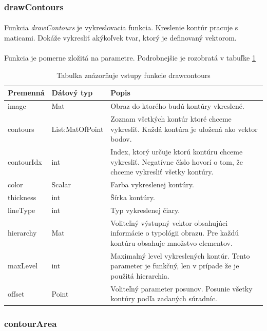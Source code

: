 \documentclass[12pt]{article}
\begin{document}
\subsubsection{drawContours}
\paragraph{}
Funkcia \emph{drawContours} je vykreslovacia funkcia. Kreslenie kontúr pracuje s maticami. Dokáže vykresliť akýkoľvek tvar, ktorý je definovaný vektorom.
\cite{OpenCVDoc}
\paragraph{}
Funkcia je pomerne zložitá na parametre. Podrobnejšie je rozobratá v tabuľke \ref{drawcontoursPar}
\begin{table}
	\centering
    \begin{tabular}{ | l | l | p{5cm} |}
    \hline
    Premenná & Dátový typ & Popis \\ \hline
    image & Mat & Obraz do ktorého budú kontúry vkreslené. \\ \hline
    contours & List:MatOfPoint & Zoznam všetkých kontúr ktoré chceme vykresliť. Každá kontúra je uložená ako vektor bodov. \\ \hline
    contourIdx & int & Index, ktorý určuje ktorú kontúru chceme vykresliť. Negatívne číslo hovorí o tom, že chceme vykresliť všetky kontúry. \\ \hline
    color & Scalar & Farba vykreslenej kontúry. \\ \hline
    thickness & int & Šírka kontúry. \\ \hline
    lineType & int & Typ vykreslenej čiary. \\ \hline
    hierarchy & Mat & Voliteľný výstupný vektor obsahujúci informácie o typológii obrazu. Pre každú kontúru obsahuje množstvo elementov. \\ \hline
    maxLevel & int & Maximalný level vykreslených kontúr. Tento parameter je funkčný, len v prípade že je použitá hierarchia. \\ \hline
    offset & Point & Voliteľný parameter posunov. Posunie všetky kontúry podľa zadaných súradníc. \\
    \hline
    \end{tabular}
  	\caption{Tabulka znázorňuje vstupy funkcie drawcontours}
  	\label{drawcontoursPar}
\end{table}
\subsubsection{contourArea}
\end{document}
